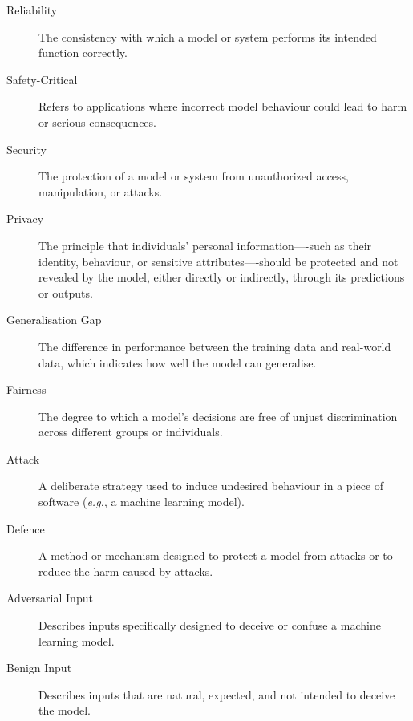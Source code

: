 \begin{description}
    \item[Reliability] The consistency with which a model or system performs its intended function correctly.
    \item[Safety-Critical] Refers to applications where incorrect model behaviour could lead to harm or serious consequences.
    \item[Security] The protection of a model or system from unauthorized access, manipulation, or attacks.
    \item[Privacy] The principle that individuals’ personal information—-such as their identity, behaviour, or sensitive attributes—-should be protected and not revealed by the model, either directly or indirectly, through its predictions or outputs.
    \item[Generalisation Gap] The difference in performance between the training data and real-world data, which indicates how well the model can generalise.
    \item[Fairness] The degree to which a model’s decisions are free of unjust discrimination across different groups or individuals.
    \item[Attack] A deliberate strategy used to induce undesired behaviour in a piece of software (\textit{e.g.}, a machine learning model).
    \item[Defence] A method or mechanism designed to protect a model from attacks or to reduce the harm caused by attacks.
    \item[Adversarial Input] Describes inputs specifically designed to deceive or confuse a machine learning model.
    \item[Benign Input] Describes inputs that are natural, expected, and not intended to deceive the model.
\end{description}


